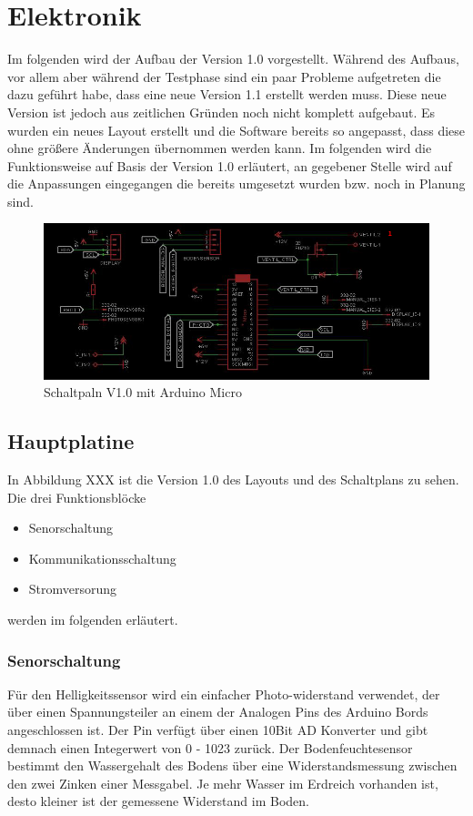 \documentclass[]{IEEEtran}
\begin{document}
\section{Elektronik}
	Im folgenden wird der Aufbau der Version 1.0 vorgestellt. Während des Aufbaus, vor allem aber während der Testphase sind ein paar Probleme aufgetreten die dazu geführt habe, dass eine neue Version 1.1 erstellt werden muss. 
	Diese neue Version ist jedoch aus zeitlichen Gründen noch nicht komplett aufgebaut. 
	Es wurden ein neues Layout erstellt und die Software bereits so angepasst, dass diese ohne größere Änderungen übernommen werden kann. 
	Im folgenden wird die Funktionsweise auf Basis der Version 1.0 erläutert, an gegebener Stelle wird auf die  Anpassungen eingegangen die bereits umgesetzt wurden bzw. noch in Planung sind. 
\begin{figure}
	\centering
	\includegraphics[width=0.9\linewidth]{bilder/v1SchaltplanMicro.JPG}
	\caption{Schaltpaln V1.0 mit Arduino Micro}
	\label{fig-Schaltplanv1.1}
\end{figure}

\subsection{Hauptplatine}



In Abbildung XXX ist die Version 1.0 des Layouts und des Schaltplans zu sehen. Die drei Funktionsblöcke
\begin{itemize}
		\item Senorschaltung
		\item Kommunikationsschaltung
		\item Stromversorung
\end{itemize}
werden im folgenden erläutert. 


		
		
			
\subsubsection{Senorschaltung} \label{sensorik}
Für den Helligkeitssensor wird ein einfacher Photo-widerstand verwendet, der über einen Spannungsteiler an einem der Analogen Pins des Arduino Bords angeschlossen ist. Der Pin verfügt über einen 10Bit AD Konverter und gibt demnach einen Integerwert von 0 - 1023 zurück.
Der Bodenfeuchtesensor bestimmt den Wassergehalt des Bodens über eine Widerstandsmessung zwischen den zwei Zinken einer Messgabel. Je mehr Wasser im Erdreich vorhanden ist, desto kleiner ist der gemessene Widerstand im Boden.
\end{document}
